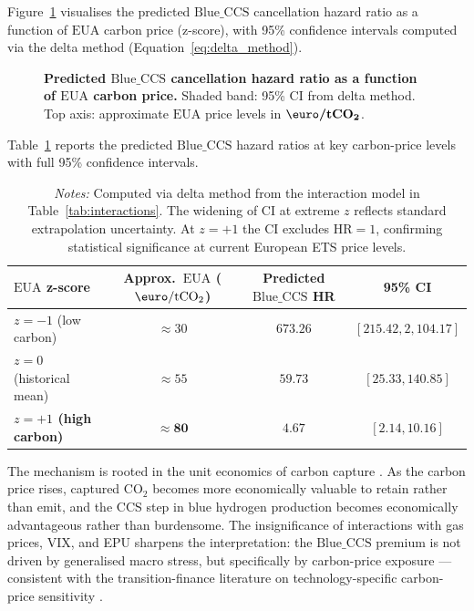 \documentclass[11pt,a4paper]{article}
\newcommand{\HR}{\mathrm{HR}}
\newcommand{\BlueCCS}{\mathrm{Blue\_CCS}}
\newcommand{\EUA}{\mathrm{EUA}}
\begin{document}
Figure~\ref{fig:eua} visualises the predicted $\BlueCCS$ cancellation hazard ratio as a function of $\EUA$ carbon price (z-score), with 95\% confidence intervals computed via the delta method (Equation~\ref{eq:delta_method}).

\begin{figure}[H]
\centering
\caption{\textbf{Predicted $\BlueCCS$ cancellation hazard ratio as a function of $\EUA$ carbon price.} Shaded band: 95\% CI from delta method. Top axis: approximate $\EUA$ price levels in $\bm{\text{\euro}/\mathrm{tCO}_2}$.}
\label{fig:eua}
\end{figure}

Table~\ref{tab:eua_levels} reports the predicted $\BlueCCS$ hazard ratios at key carbon-price levels with full 95\% confidence intervals.

\begin{table}[H]
\centering
\caption{Predicted $\BlueCCS$ hazard ratio at key carbon-price levels.}
\label{tab:eua_levels}
\small
\begin{tabular}{lccc}
\toprule
\textbf{$\EUA$ z-score} & \textbf{Approx.\ $\EUA$ ($\text{\euro}/\mathrm{tCO}_2$)} & \textbf{Predicted $\BlueCCS$ HR} & \textbf{95\% CI} \\
\midrule
$z = -1$ (low carbon) & $\approx 30$ & $673.26$ & $[215.42, 2{,}104.17]$ \\
$z = 0$ (historical mean) & $\approx 55$ & $59.73$ & $[25.33, 140.85]$ \\
\textbf{$z = +1$ (high carbon)} & $\mathbf{\approx 80}$ & $\mathbf{4.67}$ & $\mathbf{[2.14, 10.16]}$ \\
\bottomrule
\end{tabular}
\caption*{\footnotesize \textit{Notes:} Computed via delta method from the interaction model in Table~\ref{tab:interactions}. The widening of CI at extreme $z$ reflects standard extrapolation uncertainty. At $z = +1$ the CI excludes $\HR = 1$, confirming statistical significance at current European ETS price levels.}
\end{table}

The mechanism is rooted in the unit economics of carbon capture \citep{Bui2018, Budinis2018}. As the carbon price rises, captured $\mathrm{CO}_2$ becomes more economically valuable to retain rather than emit, and the CCS step in blue hydrogen production becomes economically advantageous rather than burdensome. The insignificance of interactions with gas prices, VIX, and EPU sharpens the interpretation: the $\BlueCCS$ premium is not driven by generalised macro stress, but specifically by carbon-price exposure --- consistent with the transition-finance literature on technology-specific carbon-price sensitivity \citep{BoltonKacperczyk2021, Mercure2018}.
\end{document}

